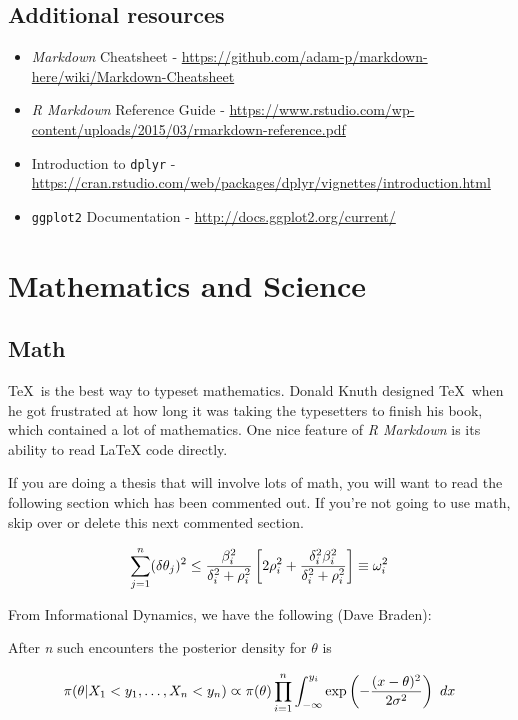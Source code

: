 \documentclass[12pt,twoside]{reedthesis}
\begin{document}
\hypertarget{additional-resources}{%
\section{Additional resources}\label{additional-resources}}
\begin{itemize}
\item
  \emph{Markdown} Cheatsheet - \url{https://github.com/adam-p/markdown-here/wiki/Markdown-Cheatsheet}
\item
  \emph{R Markdown} Reference Guide - \url{https://www.rstudio.com/wp-content/uploads/2015/03/rmarkdown-reference.pdf}
\item
  Introduction to \texttt{dplyr} - \url{https://cran.rstudio.com/web/packages/dplyr/vignettes/introduction.html}
\item
  \texttt{ggplot2} Documentation - \url{http://docs.ggplot2.org/current/}
\end{itemize}
\hypertarget{math-sci}{%
\chapter{Mathematics and Science}\label{math-sci}}

\hypertarget{math}{%
\section{Math}\label{math}}

\TeX~is the best way to typeset mathematics. Donald Knuth designed \TeX~when he got frustrated at how long it was taking the typesetters to finish his book, which contained a lot of mathematics. One nice feature of \emph{R Markdown} is its ability to read LaTeX code directly.

If you are doing a thesis that will involve lots of math, you will want to read the following section which has been commented out. If you're not going to use math, skip over or delete this next commented section.

\[\sum_{j=1}^n (\delta\theta_j)^2 \leq {{\beta_i^2}\over{\delta_i^2 + \rho_i^2}}
\left[ 2\rho_i^2 + {\delta_i^2\beta_i^2\over{\delta_i^2 + \rho_i^2}} \right] \equiv \omega_i^2
\]

From Informational Dynamics, we have the following (Dave Braden):

After \emph{n} such encounters the posterior density for \(\theta\) is

\[
\pi(\theta|X_1< y_1,\dots,X_n<y_n) \varpropto \pi(\theta) \prod_{i=1}^n\int_{-\infty}^{y_i}
   \exp\left(-{(x-\theta)^2\over{2\sigma^2}}\right)\ dx
\]
\end{document}

